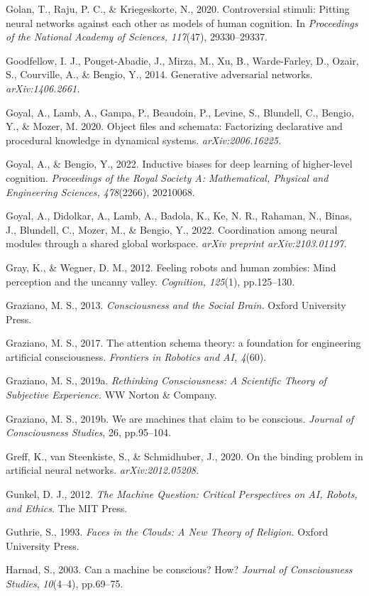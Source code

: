 \documentclass[12pt]{article}
\begin{document}
Golan, T., Raju, P. C., \& Kriegeskorte, N., 2020. Controversial stimuli: Pitting neural networks against each other as models of human cognition. In \textit{Proceedings of the National Academy of Sciences, 117}(47), 29330–29337.

Goodfellow, I. J., Pouget-Abadie, J., Mirza, M., Xu, B., Warde-Farley,
D., Ozair, S., Courville, A., \& Bengio, Y., 2014. Generative
adversarial networks. \emph{arXiv:1406.2661.}

Goyal, A., Lamb, A., Gampa, P., Beaudoin, P., Levine, S., Blundell, C.,
Bengio, Y., \& Mozer, M. 2020. Object files and schemata: Factorizing
declarative and procedural knowledge in dynamical systems.
\emph{arXiv:2006.16225.}

Goyal, A., \& Bengio, Y., 2022. Inductive biases for deep learning of
higher-level cognition. \emph{Proceedings of the Royal Society A:
Mathematical, Physical and Engineering Sciences, 478}(2266), 20210068.

Goyal, A., Didolkar, A., Lamb, A., Badola, K., Ke, N. R., Rahaman, N.,
Binas, J., Blundell, C., Mozer, M., \& Bengio, Y., 2022. Coordination
among neural modules through a shared global workspace. \emph{arXiv
preprint arXiv:2103.01197.}

Gray, K., \& Wegner, D. M., 2012. Feeling robots and human zombies: Mind
perception and the uncanny valley. \emph{Cognition, 125}(1),
pp.125--130.

Graziano, M. S., 2013. \emph{Consciousness and the Social Brain.} Oxford
University Press.

Graziano, M. S., 2017. The attention schema theory: a foundation for
engineering artificial consciousness. \emph{Frontiers in Robotics and
AI, 4}(60).

Graziano, M. S., 2019a. \emph{Rethinking Consciousness: A Scientific
Theory of Subjective Experience.} WW Norton \& Company.

Graziano, M. S., 2019b. We are machines that claim to be conscious.
\emph{Journal of Consciousness Studies}, 26, pp.95--104.

Greff, K., van Steenkiste, S., \& Schmidhuber, J., 2020. On the binding
problem in artificial neural networks. \emph{arXiv:2012.05208.}

Gunkel, D. J., 2012. \emph{The Machine Question: Critical Perspectives
on AI, Robots, and Ethics}. The MIT Press.

Guthrie, S., 1993. \emph{Faces in the Clouds: A New Theory of Religion.}
Oxford University Press.

Harnad, S., 2003. Can a machine be conscious? How? \emph{Journal of
Consciousness Studies}, \emph{10}(4--4), pp.69--75.
\end{document}
